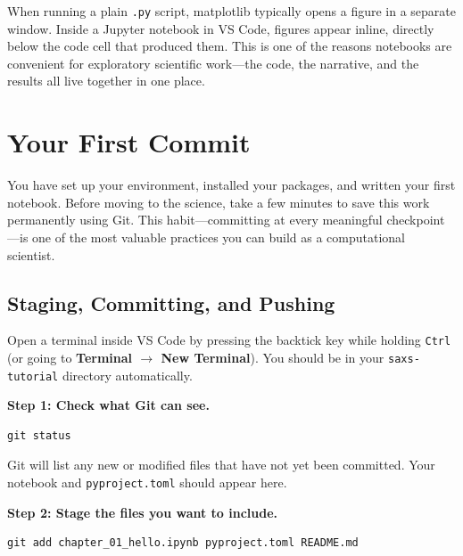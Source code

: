 \documentclass[nobib]{tufte-book}
\begin{document}
\begin{notebox}[title={Inline Figures in VS Code}]
When running a plain \texttt{.py} script, matplotlib typically opens a
figure in a separate window.
Inside a Jupyter notebook in VS Code, figures appear inline, directly below
the code cell that produced them.
This is one of the reasons notebooks are convenient for exploratory
scientific work---the code, the narrative, and the results all live
together in one place.
\end{notebox}

\chapter{Your First Commit}
\label{ch:firstcommit}

You have set up your environment, installed your packages, and written your
first notebook.
Before moving to the science, take a few minutes to save this work
permanently using Git.
This habit---committing at every meaningful checkpoint---is one of the most
valuable practices you can build as a computational scientist.

\section{Staging, Committing, and Pushing}

Open a terminal inside VS Code by pressing the backtick key while holding
\texttt{Ctrl} (or going to \textbf{Terminal $\rightarrow$ New Terminal}).
You should be in your \texttt{saxs-tutorial} directory automatically.

\medskip
\noindent\textbf{Step 1: Check what Git can see.}

\begin{lstlisting}[style=bashstyle]
git status
\end{lstlisting}

Git will list any new or modified files that have not yet been committed.
Your notebook and \texttt{pyproject.toml} should appear here.

\medskip
\noindent\textbf{Step 2: Stage the files you want to include.}

\begin{lstlisting}[style=bashstyle]
git add chapter_01_hello.ipynb pyproject.toml README.md
\end{lstlisting}
\end{document}
